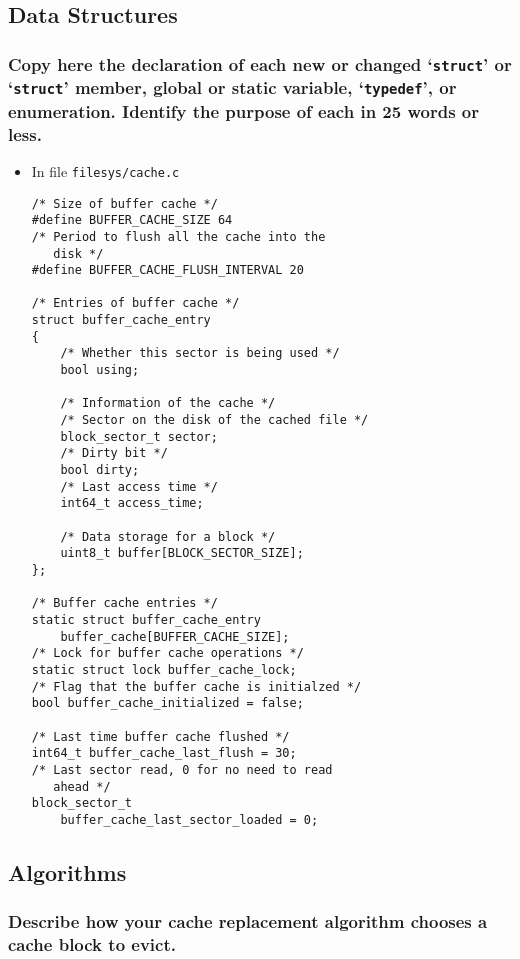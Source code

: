 \documentclass[sigconf, nonacm, balance=false, urlbreakonhyphens=true]{acmart}
\begin{document}
        \subsection{Data Structures}
            
            \subsubsection{Copy here the declaration of each new or changed `\texttt{struct}' or `\texttt{struct}' member, global or static variable, `\texttt{typedef}', or enumeration. Identify the purpose of each in 25 words or less. }
    
            \begin{itemize}
                \item In file \texttt{filesys/cache.c}
\begin{verbatim}
/* Size of buffer cache */
#define BUFFER_CACHE_SIZE 64
/* Period to flush all the cache into the 
   disk */
#define BUFFER_CACHE_FLUSH_INTERVAL 20

/* Entries of buffer cache */
struct buffer_cache_entry
{
    /* Whether this sector is being used */
    bool using;

    /* Information of the cache */
    /* Sector on the disk of the cached file */
    block_sector_t sector;
    /* Dirty bit */
    bool dirty;
    /* Last access time */
    int64_t access_time;

    /* Data storage for a block */
    uint8_t buffer[BLOCK_SECTOR_SIZE];
};

/* Buffer cache entries */
static struct buffer_cache_entry 
    buffer_cache[BUFFER_CACHE_SIZE];
/* Lock for buffer cache operations */
static struct lock buffer_cache_lock;
/* Flag that the buffer cache is initialzed */
bool buffer_cache_initialized = false;

/* Last time buffer cache flushed */
int64_t buffer_cache_last_flush = 30;
/* Last sector read, 0 for no need to read 
   ahead */
block_sector_t 
    buffer_cache_last_sector_loaded = 0;
\end{verbatim}
            \end{itemize}

        \subsection{Algorithms}

            \subsubsection{Describe how your cache replacement algorithm chooses a cache block to evict. } 
\end{document}
